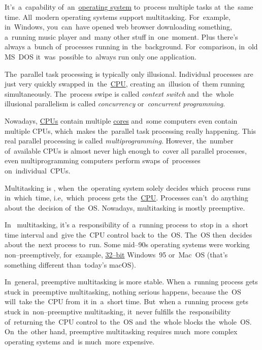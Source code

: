 \label{multitasking}
It's~a~capability of~an~\hyperref[os]{operating system} to~process multiple tasks at~the~same time.
All~modern operating systems support multitasking.
For~example, in~Windows, you~can~have opened web browser downloading something, a~running music player and~many other stuff in~one~moment.
Plus there's always a~bunch of~processes running in~the~background.
For~comparison, in~old \mbox{MS DOS} it~was~possible to~always run only one application.

The~parallel task processing is typically only illusional.
Individual processes are just very quickly swapped in~the~\hyperref[processorcpucore]{CPU}, creating an~illusion of~them running simultaneously.
The~process swipe is called \textit{context switch} and~the~whole illusional parallelism is called \textit{concurrency} or~\textit{concurrent programming}.

Nowadays, \hyperref[processorcpucore]{CPUs} contain multiple \hyperref[processorcpucore]{cores} and~some computers even contain multiple CPUs, which~makes the~parallel task processing really happening.
This real parallel processing is called \textit{multiprogramming}.
However, the~number of~available CPUs is almost never high enough to~cover all parallel processes, even multiprogramming computers perform swaps of~processes on~individual~CPUs.

\label{preemption}
Multitasking is , when~the~operating system solely decides which~process runs in~which~time, i.e,~which~process gets the~\hyperref[processorcpucore]{CPU}.
Processes can't~do anything about the~decision of~the~OS\@.
Nowadays, multitasking is mostly preemptive.

In~ multitasking, it's a~responsibility of~a~running process to~stop in~a~short time interval and~give the~CPU control back to~the~OS\@.
The~OS then~decides about the~next process to~run.
Some mid--90s operating systems were working non--preemptively, for~example, \hyperref[32bvs64b]{32--bit} Windows~95 \mbox{or Mac OS} (that's something different \mbox{than today's} macOS).

In~general, preemptive multitasking is more stable.
When a~running process gets stuck in~preemptive multitasking, nothing serious happens, because the~OS will~take the~CPU from~it in~a~short time.
But~when a~running process gets stuck in~non--preemptive multitasking, it~never fulfills the~responsibility of~returning the~CPU control to~the~OS and~the~whole blocks the~whole~OS\@.
On~the~other hand, preemptive multitasking requires much~more complex operating systems and~is much~more expensive.

